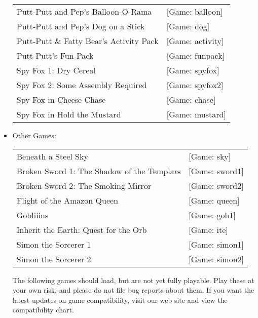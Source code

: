 \begin{itemize}
\begin{tabular}[h]{ll}
    Putt-Putt and Pep's Balloon-O-Rama&                            [Game: balloon]\\
    Putt-Putt and Pep's Dog on a Stick&                            [Game: dog]\\
    Putt-Putt \& Fatty Bear's Activity Pack&                       [Game: activity]\\
    Putt-Putt's Fun Pack&                                          [Game: funpack]\\
    Spy Fox 1: Dry Cereal&                                         [Game: spyfox]\\
    Spy Fox 2: Some Assembly Required&                             [Game: spyfox2]\\
    Spy Fox in Cheese Chase&                                       [Game: chase]\\
    Spy Fox in Hold the Mustard&                                   [Game: mustard]\\
  \end{tabular}
\item Other Games:\\ 
  \begin{tabular}[h]{ll}
    Beneath a Steel Sky&                           [Game: sky]\\
    Broken Sword 1: The Shadow of the Templars&    [Game: sword1]\\
    Broken Sword 2: The Smoking Mirror&            [Game: sword2]\\
    Flight of the Amazon Queen&                    [Game: queen]\\
    Gobliiins&                                     [Game: gob1]\\
    Inherit the Earth: Quest for the Orb&          [Game: ite]\\
    Simon the Sorcerer 1&                          [Game: simon1]\\
    Simon the Sorcerer 2&                          [Game: simon2]\\
  \end{tabular}

  The following games should load, but are not yet fully playable. Play these at your own risk, and please do not file bug reports about them. If you want
the latest updates on game compatibility, visit our web site and view the
compatibility chart.


\end{itemize}
